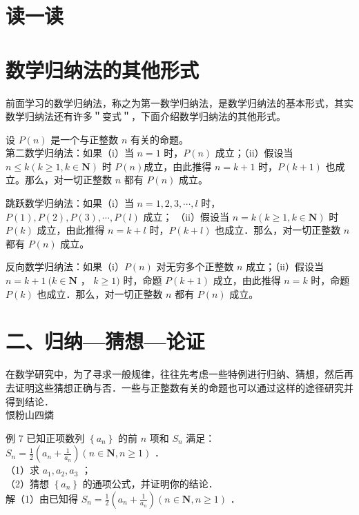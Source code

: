 \documentclass[10pt]{article}
\begin{document}
\section*{读一读}
\section*{数学归纳法的其他形式}
前面学习的数学归纳法，称之为第一数学归纳法，是数学归纳法的基本形式，其实数学归纳法还有许多＂变式＂，下面介绍数学归纳法的其他形式。

设 \(P(n)\) 是一个与正整数 \(n\) 有关的命题。\\
第二数学归纳法：如果（i）当 \(n=1\) 时，\(P(n)\) 成立；（ii）假设当 \(n \leqslant k(k \geqslant 1, k \in \mathbf{N})\) 时 \(P(n)\)成立，由此推得 \(n=k+1\) 时，\(P(k+1)\) 也成立。那么，对一切正整数 \(n\) 都有 \(P(n)\) 成立。

跳跃数学归纳法：如果（i）当 \(n=1,2,3, \cdots, l\) 时，\(P(1), P(2), P(3), \cdots, P(l)\) 成立； （ii）假设当 \(n=k(k \geqslant 1, k \in \mathbf{N})\) 时 \(P(k)\) 成立，由此推得 \(n=k+l\) 时，\(P(k+l)\) 也成立．那么，对一切正整数 \(n\) 都有 \(P(n)\) 成立。

反向数学归纳法：如果（i）\(P(n)\) 对无穷多个正整数 \(n\) 成立；（ii）假设当 \(n=k+1 ~(k \in \mathbf{N}\) ， \(k \geqslant 1)\) 时，命题 \(P(k+1)\) 成立，由此推得 \(n=k\) 时，命题 \(P(k)\) 也成立．那么，对一切正整数 \(n\) 都有 \(P(n)\) 成立。

\section*{二、归纳—猜想—论证}
在数学研究中，为了寻求一般规律，往往先考虑一些特例进行归纳、猜想，然后再去证明这些猜想正确与否．一些与正整数有关的命题也可以通过这样的途径研究并得到结论．\\
恨粉山四燐

例 7 已知正项数列 \(\left\{a_{n}\right\}\) 的前 \(n\) 项和 \(S_{n}\) 满足：\(S_{n}=\frac{1}{2}\left(a_{n}+\frac{1}{a_{n}}\right)(n \in \mathbf{N}, n \geqslant 1)\) ．\\
（1）求 \(a_{1}, a_{2}, a_{3}\) ；\\
（2）猜想 \(\left\{a_{n}\right\}\) 的通项公式，并证明你的结论．\\
解（1）由已知得 \(S_{n}=\frac{1}{2}\left(a_{n}+\frac{1}{a_{n}}\right)(n \in \mathbf{N}, n \geqslant 1)\) ．
\end{document}
